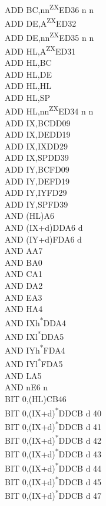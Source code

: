 \documentclass[oneside,a4paper]{book}
\begin{document}
\begin{multicols}{3}
{\begin{tabbing}
ADD BC,nn\textsuperscript{ZX}\>ED36	n n\\
ADD DE,A\textsuperscript{ZX}\>ED32\\
ADD DE,nn\textsuperscript{ZX}\>ED35 n n\\
ADD HL,A\textsuperscript{ZX}\>ED31\\
ADD HL,BC\\
ADD HL,DE\\
ADD HL,HL\\
ADD HL,SP\\
ADD HL,nn\textsuperscript{ZX}\>ED34 n n\\
ADD IX,BC\>DD09\\
ADD IX,DE\>DD19\\
ADD IX,IX\>DD29\\
ADD IX,SP\>DD39\\
ADD IY,BC\>FD09\\
ADD IY,DE\>FD19\\
ADD IY,IY\>FD29\\
ADD IY,SP\>FD39\\
AND (HL)\>A6\\
AND (IX+d)\>DDA6 d\\
AND (IY+d)\>FDA6 d\\
AND A\>A7\\
AND B\>A0\\
AND C\>A1\\
AND D\>A2\\
AND E\>A3\\
AND H\>A4\\
AND IXh\textsuperscript{*}\>DDA4\\
AND IXl\textsuperscript{*}\>DDA5\\
AND IYh\textsuperscript{*}\>FDA4\\
AND IYl\textsuperscript{*}\>FDA5\\
AND L\>A5\\
AND n\>E6 n\\
BIT 0,(HL)\>CB46\\
BIT 0,(IX+d)\textsuperscript{*}\>DDCB d 40\\
BIT 0,(IX+d)\textsuperscript{*}\>DDCB d 41\\
BIT 0,(IX+d)\textsuperscript{*}\>DDCB d 42\\
BIT 0,(IX+d)\textsuperscript{*}\>DDCB d 43\\
BIT 0,(IX+d)\textsuperscript{*}\>DDCB d 44\\
BIT 0,(IX+d)\textsuperscript{*}\>DDCB d 45\\
BIT 0,(IX+d)\textsuperscript{*}\>DDCB d 47\\

\end{tabbing}}
\end{multicols}
\end{document}
